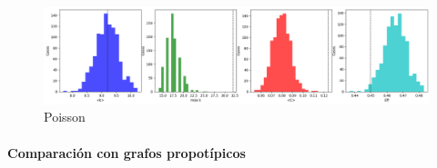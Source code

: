 \documentclass{article}
\begin{document}
\begin{figure}[ht]
  \centering
  \includegraphics[width= \linewidth]{hist_poisson}
  \caption{Poisson
	}
	\label{fg:hist_poisson}
\end{figure}


\paragraph{Comparación con grafos propotípicos}




\printbibliography[title= Referencias, heading=bibintoc]
\end{document}
